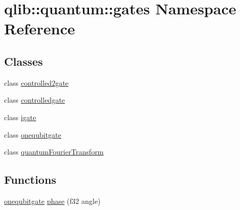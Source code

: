 \hypertarget{namespaceqlib_1_1quantum_1_1gates}{}\section{qlib\+:\+:quantum\+:\+:gates Namespace Reference}
\label{namespaceqlib_1_1quantum_1_1gates}
\subsection*{Classes}
\begin{DoxyCompactItemize}
\item 
class \hyperlink{classqlib_1_1quantum_1_1gates_1_1controlled2gate}{controlled2gate}
\item 
class \hyperlink{classqlib_1_1quantum_1_1gates_1_1controlledgate}{controlledgate}
\item 
class \hyperlink{classqlib_1_1quantum_1_1gates_1_1igate}{igate}
\item 
class \hyperlink{classqlib_1_1quantum_1_1gates_1_1onequbitgate}{onequbitgate}
\item 
class \hyperlink{classqlib_1_1quantum_1_1gates_1_1quantumFourierTransform}{quantum\+Fourier\+Transform}
\end{DoxyCompactItemize}
\subsection*{Functions}
\begin{DoxyCompactItemize}
\item 
\hyperlink{classqlib_1_1quantum_1_1gates_1_1onequbitgate}{onequbitgate} \hyperlink{namespaceqlib_1_1quantum_1_1gates_a9404266e9a103216de1b3c5ae2b8c8e5}{phase} (f32 angle)
\end{DoxyCompactItemize}
